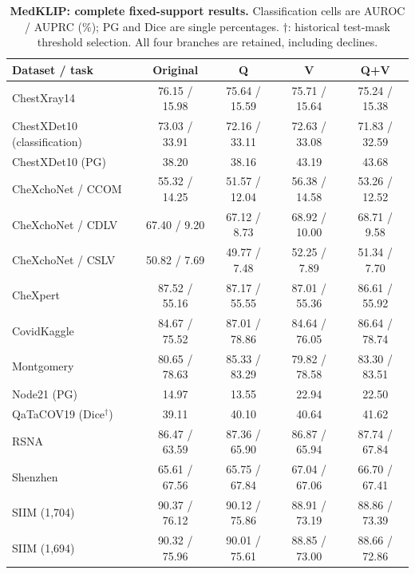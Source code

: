 \begin{table}[tp]
\centering
\caption{\textbf{MedKLIP: complete fixed-support results.} Classification cells are AUROC / AUPRC (\%); PG and Dice are single percentages. $\dagger$: historical test-mask threshold selection. All four branches are retained, including declines.}
\label{tab:supp-fixed-medklip}
\small
\setlength{\tabcolsep}{4pt}
\begin{tabular*}{\textwidth}{@{\extracolsep{\fill}}lcccc@{}}
\toprule
Dataset / task & Original & Q & V & Q+V \\
\midrule
ChestXray14 & 76.15 / 15.98 & 75.64 / 15.59 & 75.71 / 15.64 & 75.24 / 15.38 \\
ChestXDet10 (classification) & 73.03 / 33.91 & 72.16 / 33.11 & 72.63 / 33.08 & 71.83 / 32.59 \\
ChestXDet10 (PG) & 38.20 & 38.16 & 43.19 & 43.68 \\
CheXchoNet / CCOM & 55.32 / 14.25 & 51.57 / 12.04 & 56.38 / 14.58 & 53.26 / 12.52 \\
CheXchoNet / CDLV & 67.40 / 9.20 & 67.12 / 8.73 & 68.92 / 10.00 & 68.71 / 9.58 \\
CheXchoNet / CSLV & 50.82 / 7.69 & 49.77 / 7.48 & 52.25 / 7.89 & 51.34 / 7.70 \\
CheXpert & 87.52 / 55.16 & 87.17 / 55.55 & 87.01 / 55.36 & 86.61 / 55.92 \\
CovidKaggle & 84.67 / 75.52 & 87.01 / 78.86 & 84.64 / 76.05 & 86.64 / 78.74 \\
Montgomery & 80.65 / 78.63 & 85.33 / 83.29 & 79.82 / 78.58 & 83.30 / 83.51 \\
Node21 (PG) & 14.97 & 13.55 & 22.94 & 22.50 \\
QaTaCOV19 (Dice$^\dagger$) & 39.11 & 40.10 & 40.64 & 41.62 \\
RSNA & 86.47 / 63.59 & 87.36 / 65.90 & 86.87 / 65.94 & 87.74 / 67.84 \\
Shenzhen & 65.61 / 67.56 & 65.75 / 67.84 & 67.04 / 67.06 & 66.70 / 67.41 \\
SIIM (1,704) & 90.37 / 76.12 & 90.12 / 75.86 & 88.91 / 73.19 & 88.86 / 73.39 \\
SIIM (1,694) & 90.32 / 75.96 & 90.01 / 75.61 & 88.85 / 73.00 & 88.66 / 72.86 \\
\bottomrule
\end{tabular*}
\end{table}

